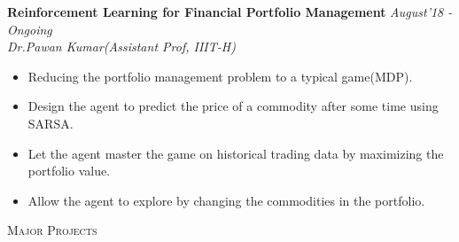 \documentclass[10pt]{article}
\newenvironment{changemargin}[2]{%
    \begin{list}{}{%
            \setlength{\topsep}{0pt}%
            \setlength{\leftmargin}{#1}%
            \setlength{\rightmargin}{#2}%
            \setlength{\listparindent}{\parindent}%
        \setlength{\itemindent}{\parindent}%
            \setlength{\parsep}{\parskip}%
        }%
\item[]}{\end{list}
}
\newcommand{\lineover}{
    \begin{changemargin}{-0.05in}{-0.10in}
        \vspace*{-8pt}
        \hrulefill \\
        \vspace*{-2pt}
    \end{changemargin}
}
\newcommand{\header}[1]{
    \begin{changemargin}{-0.75in}{-0.75in}
        \scshape{#1}\\
        \lineover
    \end{changemargin}
}
\newenvironment{body} {
    \vspace*{-16pt}
    \begin{changemargin}{-0.6in}{-0.65in}
    }     
    {\end{changemargin}
}
\begin{document}
\begin{body}
    \vspace{14pt}
    \textbf{Reinforcement Learning for Financial Portfolio Management} \hfill \emph{August'18 - Ongoing}\\
    \emph{Dr.Pawan Kumar(Assistant Prof, IIIT-H)}
    \begin{itemize}
        \item{Reducing the portfolio management problem to a typical game(MDP).}
        \item{Design the agent to predict the price of a commodity after some time using SARSA.}
        \item{Let the agent master the game on historical trading data by maximizing the portfolio value.}
        \item{Allow the agent to explore by changing the commodities in the portfolio.}
    \end{itemize}
    \smallskip 
\end{body}



 \header{Major Projects}
\end{document}
